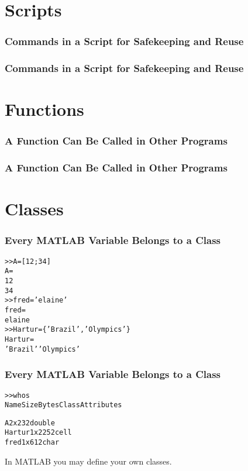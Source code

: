 \documentclass[12pt, compress,xcolor={usenames,dvipsnames}]{beamer} %
\newcommand{\Matlab}{MATLAB\xspace}
\begin{document}
\section{Scripts}

\begin{frame}[fragile]\frametitle{Commands in a Script for Safekeeping and Reuse}
	\vspace{-8ex}

\end{frame}

\begin{frame}[fragile]\frametitle{Commands in a Script for Safekeeping and Reuse}
	\vspace{-8ex}
	
\end{frame}

\section{Functions}
	
\begin{frame}[fragile]\frametitle{A Function Can Be Called in Other Programs}
	\vspace{-8ex}
		
\end{frame}
	
\begin{frame}[fragile]\frametitle{A Function Can Be Called in Other Programs}
	\vspace{-8ex}
		
\end{frame}


\section{Classes}

\begin{frame}[fragile]\frametitle{Every \Matlab Variable Belongs to a Class}
	\begin{alltt}
		>> A = [1 2; 3 4]
		A =
		1     2
		3     4
		>> fred = 'elaine'
		fred =
		elaine
		>> Hartur = \{'Brazil','Olympics'\}
		Hartur = 
		'Brazil'    'Olympics'
			\end{alltt}
\end{frame}

\begin{frame}[fragile]\frametitle{Every \Matlab Variable Belongs to a Class}
	\vspace{-5ex}
	\begin{alltt}
		>> whos
		Name        Size            Bytes  Class     Attributes
		
		A           2x2                32  double              
		Hartur      1x2               252  cell                
		fred        1x6                12  char                
	\end{alltt}
	In \Matlab you may define your \alert{own} classes.
\end{frame}
\end{document}
